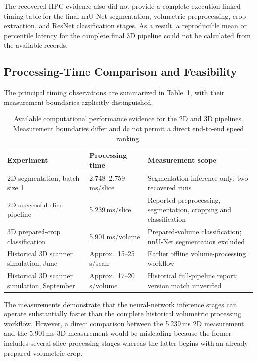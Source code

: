 The recovered HPC evidence also did not provide a complete execution-linked timing table for the final nnU-Net segmentation, volumetric preprocessing, crop extraction, and ResNet classification stages. As a result, a reproducible mean or percentile latency for the complete final 3D pipeline could not be calculated from the available records.

\subsection{Processing-Time Comparison and Feasibility}
\label{subsec:results_latency_comparison}

The principal timing observations are summarized in Table~\ref{tab:results_runtime_scope}, with their measurement boundaries explicitly distinguished.

\begin{table}[htbp]
\centering
\caption{Available computational performance evidence for the 2D and 3D pipelines. Measurement boundaries differ and do not permit a direct end-to-end speed ranking.}
\label{tab:results_runtime_scope}
\begin{tabular}{p{}p{}p{}}
\hline
Experiment & Processing time & Measurement scope \\
\hline
2D segmentation, batch size 1 & 2.748--2.759\,ms/slice & Segmentation inference only; two recovered runs \\
2D successful-slice pipeline & 5.239\,ms/slice & Reported preprocessing, segmentation, cropping and classification \\
3D prepared-crop classification & 5.901\,ms/volume & Prepared-volume classification; nnU-Net segmentation excluded \\
Historical 3D scanner simulation, June & Approx.\ 15--25\,s/scan & Earlier offline volume-processing workflow \\
Historical 3D scanner simulation, September & Approx.\ 17--20\,s/volume & Historical full-pipeline report; version match unverified \\
\hline
\end{tabular}
\end{table}

The measurements demonstrate that the neural-network inference stages can operate substantially faster than the complete historical volumetric processing workflow. However, a direct comparison between the 5.239\,ms 2D measurement and the 5.901\,ms 3D measurement would be misleading because the former includes several slice-processing stages whereas the latter begins with an already prepared volumetric crop.

